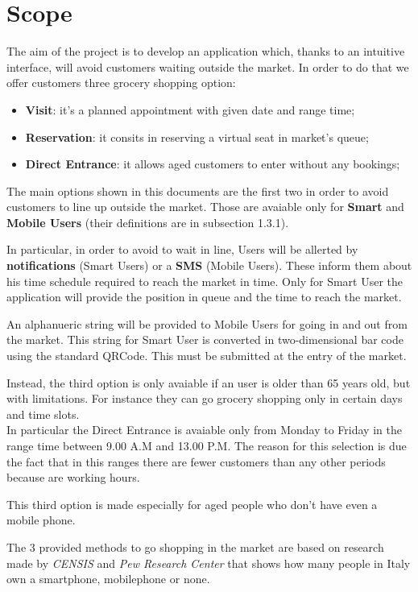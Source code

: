  
\section{Scope}

The aim of the project is to develop an application which, thanks to an intuitive interface, will avoid customers waiting outside the market.
In order to do that we offer customers three grocery shopping option: 

\begin{itemize}
\item \textbf{Visit}: it's a planned appointment with given date and range time;
\item \textbf{Reservation}: it consits in reserving a virtual seat in market's queue;
\item \textbf{Direct Entrance}: it allows aged customers to enter without any bookings;
\end{itemize}
\bigskip
The main options shown in this documents are the first two in order to avoid customers to line up outside the market. Those are avaiable only for \textbf{Smart} and \textbf{Mobile Users} (their definitions are in subsection 1.3.1).\par
In particular, in order to avoid to wait in line, Users will be allerted by \textbf{notifications} (Smart Users) or a \textbf{SMS} (Mobile Users). These inform them about his time schedule required to reach the market in time.
Only for Smart User the application will provide the position in queue and the time to reach the market.\par
An alphanueric string will be provided to Mobile Users for going in and out from the market. This string for Smart User is converted in two-dimensional bar code using the standard QRCode. This must be submitted at the entry of the market.\par
Instead, the third option is only avaiable if an user is older than 65 years old, but with limitations. For instance they can go grocery shopping only in certain days and time slots. \\
In particular the Direct Entrance is avaiable only from Monday to Friday in the range time between 9.00 A.M and 13.00 P.M. The reason for this selection is due the fact that in this ranges there are fewer customers than any other periods because are working hours. \par
This third option is made especially for aged people who don't have even a mobile phone. \par
The 3 provided methods to go shopping in the market are based on research made by \textit{CENSIS} and \textit{Pew Research Center} that shows how many people in Italy own a smartphone, mobilephone or none.\\
